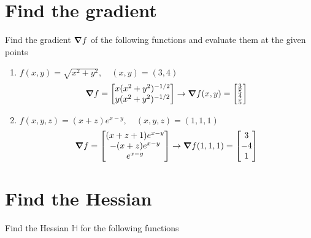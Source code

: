 \documentclass[12pt]{article}
\begin{document}
\section{Find the gradient}
Find the gradient $\grad f$ of the following functions and evaluate them at the given points
\begin{enumerate}
    \item $f(x,y) = \sqrt{x^2+y^2}, \quad (x,y)=(3,4)$
    \[ \grad f = \begin{bmatrix}
        x(x^2+y^2)^{-1/2} \\  y(x^2+y^2)^{-1/2}
    \end{bmatrix} \to \grad f (x,y) = \begin{bmatrix}
        \frac{3}{5} \\ \frac{4}{5}
    \end{bmatrix}\]
    \item $f(x,y,z) = (x+z)e^{x-y}, \quad (x,y,z)=(1,1,1)$
    \[ \grad f = \begin{bmatrix}
        (x+z+1)e^{x-y} \\ -(x+z)e^{x-y} \\ e^{x-y}
    \end{bmatrix} \to \grad f(1,1,1) = \begin{bmatrix}
        3 \\ -4 \\ 1    \end{bmatrix}\]
\end{enumerate}

\section{Find the Hessian}
Find the Hessian $\mathbb{H}$ for the following functions 
\end{document}
